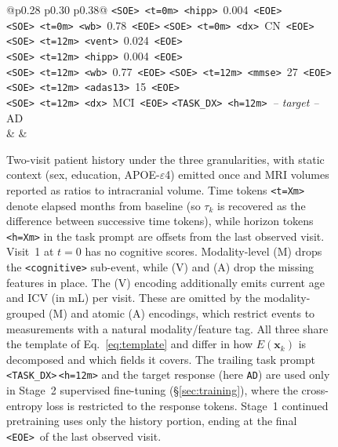 \documentclass{article}
\newcommand{\soe}{\texttt{<SOE>}}
\newcommand{\eoe}{\texttt{<EOE>}}
\newcommand{\ttoken}[1]{\texttt{<#1>}}
\begin{document}
\begin{figure}[t]
\begin{tabular}{@{}p{0.28\linewidth} p{0.30\linewidth} p{0.38\linewidth}@{}}
\soe\ \ttoken{t=0m}\ \ttoken{hipp}\ 0.004\ \eoe\newline
\soe\ \ttoken{t=0m}\ \ttoken{wb}\ 0.78\ \eoe\newline
\soe\ \ttoken{t=0m}\ \ttoken{dx}\ CN\ \eoe\newline
\soe\ \ttoken{t=12m}\ \ttoken{vent}\ 0.024\ \eoe\newline
\soe\ \ttoken{t=12m}\ \ttoken{hipp}\ 0.004\ \eoe\newline
\soe\ \ttoken{t=12m}\ \ttoken{wb}\ 0.77\ \eoe\newline
\soe\ \ttoken{t=12m}\ \ttoken{mmse}\ 27\ \eoe\newline
\soe\ \ttoken{t=12m}\ \ttoken{adas13}\ 15\ \eoe\newline
\soe\ \ttoken{t=12m}\ \ttoken{dx}\ MCI\ \eoe\newline
\ttoken{TASK\_DX}\ \ttoken{h=12m}\newline
\rmfamily\textit{\scriptsize\,-- target --}\newline
\ttfamily AD
\\
\midrule
{} &
 &
 \\
\bottomrule
\end{tabular}
\caption{Two-visit patient history under the three granularities, with static context (sex, education, APOE-$\varepsilon$4) emitted once and MRI volumes reported as ratios to intracranial volume. Time tokens \ttoken{t=Xm} denote elapsed months from baseline (so $\tau_k$ is recovered as the difference between successive time tokens), while horizon tokens \ttoken{h=Xm} in the task prompt are offsets from the last observed visit. Visit~1 at $t{=}0$ has no cognitive scores. Modality-level (M) drops the \ttoken{cognitive} sub-event, while (V) and (A) drop the missing features in place. The (V) encoding additionally emits current age and ICV (in mL) per visit. These are omitted by the modality-grouped (M) and atomic (A) encodings, which restrict events to measurements with a natural modality/feature tag. All three share the template of Eq.~\eqref{eq:template} and differ in how $E(\mathbf{x}_k)$ is decomposed and which fields it covers. The trailing task prompt \ttoken{TASK\_DX}\,\ttoken{h=12m} and the target response (here \texttt{AD}) are used only in Stage~2 supervised fine-tuning (\S\ref{sec:training}), where the cross-entropy loss is restricted to the response tokens. Stage~1 continued pretraining uses only the history portion, ending at the final \eoe\ of the last observed visit.}
\label{fig:granularity}
\end{figure}
\end{document}

